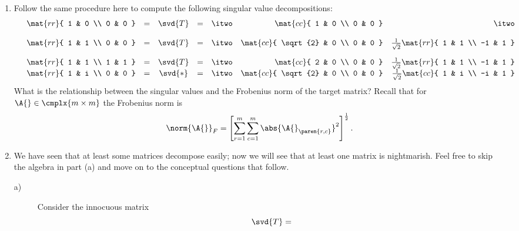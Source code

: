 \clearpage

\begin{enumerate}
\item Follow the same procedure here to compute the following singular value decompositions:
$$
\begin{array}{ ccccccrr }
   &
\mat{ rr }{
 1 & 0 \\
 0 & 0
}
   & = & \svd{T} & = 
   & \itwo
   &
\mat{ cc }{
 1 & 0 \\
 0 & 0
}
   & \itwo \\[12pt]
   &
\mat{ rr }{
 1 & 1 \\
 0 & 0
}
   & = & \svd{T} & = 
   & \itwo
   &
\mat{ cc }{
 \sqrt{2} & 0 \\
 0 & 0
}
   & \frac{ 1 }{ \sqrt{2} }
   \mat{ rr }{
     1 & 1 \\
     -1 & 1
}
   \\[12pt]
   &
\mat{ rr }{
 1 & 1 \\
 1 & 1
}
   & = & \svd{T} & = 
   & \itwo
   &
\mat{ cc }{
 2 & 0 \\
 0 & 0
}
   & \frac{ 1 }{ \sqrt{2} }
   \mat{ rr }{
     1 & 1 \\
     -1 & 1
}
   \\
   &
\mat{ rr }{
 1 & i \\
 0 & 0
}
   & = & \svd{*} & = 
   & \itwo
   &
\mat{ cc }{
 \sqrt{2} & 0 \\
 0 & 0
}
   & \frac{ 1 }{ \sqrt{2} }
   \mat{ cc }{
     1 & i \\
     -i & 1
}
   \\
\end{array}
$$
What is the relationship between the singular values and the Frobenius norm of the target matrix? Recall that for $ \A{} \in \cmplx{ m \times m } $ the Frobenius norm is
\begin{equation}
  \norm{ \A{} }_F = \left[ \sum_{ r = 1 }^{ m }{ \sum_{ c = 1 }^{ m }{ \abs{ \A{}_{\paren{ r,c }} }^2 } } \right]^{ \frac{ 1 }{ 2 } }.
\end{equation}
\item We have seen that at least some matrices decompose easily; now we will see that at least one matrix is nightmarish. Feel free to skip the algebra in part (a) and move on to the conceptual questions that follow.
\begin{description}
\item[a)] 
Consider the innocuous matrix
\begin{equation}
  \svd{T} =

\end{equation}
\end{description}
\end{enumerate}
